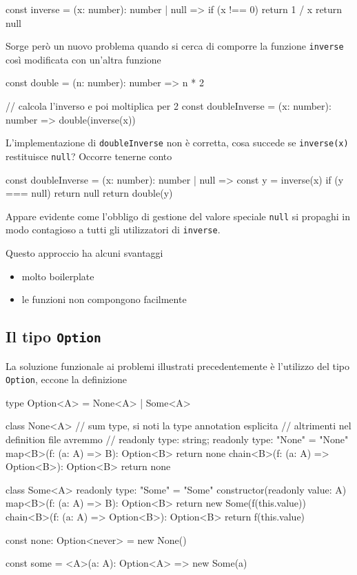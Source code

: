 \documentclass[12pt]{article}
\theoremstyle{definition}
\newenvironment{code}
  {\vspace{0.5cm} \VerbatimEnvironment\begin{typescriptcode}}
  {\end{typescriptcode} \vspace{0.2cm}}
\begin{document}
\begin{code}
const inverse = (x: number): number | null => {
  if (x !== 0) return 1 / x
  return null
}
\end{code}

Sorge però un nuovo problema quando si cerca di comporre la funzione \texttt{inverse} così modificata con un'altra funzione

\begin{code}
const double = (n: number): number => n * 2

// calcola l'inverso e poi moltiplica per 2
const doubleInverse = (x: number): number => double(inverse(x))
\end{code}

L'implementazione di \texttt{doubleInverse} non è corretta, cosa succede se \texttt{inverse(x)} restituisce \texttt{null}?
Occorre tenerne conto

\begin{code}
const doubleInverse = (x: number): number | null => {
  const y = inverse(x)
  if (y === null) return null
  return double(y)
}
\end{code}

Appare evidente come l'obbligo di gestione del valore speciale \texttt{null} si propaghi in modo contagioso
a tutti gli utilizzatori di \texttt{inverse}.

Questo approccio ha alcuni svantaggi

\begin{itemize}
  \item molto boilerplate
  \item le funzioni non compongono facilmente
\end{itemize}

\subsection{Il tipo \texttt{Option}}

La soluzione funzionale ai problemi illustrati precedentemente è l'utilizzo del tipo \texttt{Option},
eccone la definizione

\begin{code}
type Option<A> = None<A> | Some<A>

class None<A> {
  // sum type, si noti la type annotation esplicita
  // altrimenti nel definition file avremmo
  // readonly type: string;
  readonly type: "None" = "None"
  map<B>(f: (a: A) => B): Option<B> {
    return none
  }
  chain<B>(f: (a: A) => Option<B>): Option<B> {
    return none
  }
}

class Some<A> {
  readonly type: "Some" = "Some"
  constructor(readonly value: A) {}
  map<B>(f: (a: A) => B): Option<B> {
    return new Some(f(this.value))
  }
  chain<B>(f: (a: A) => Option<B>): Option<B> {
    return f(this.value)
  }
}

const none: Option<never> = new None()

const some = <A>(a: A): Option<A> => new Some(a)
\end{code}
\end{document}
